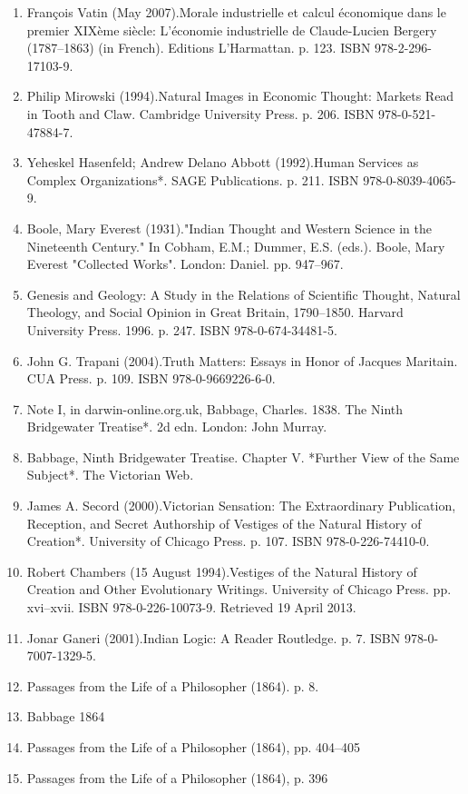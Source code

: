 \begin{enumerate}
\item François Vatin (May 2007).Morale industrielle et calcul économique dans le premier XIXème siècle: L'économie industrielle de Claude-Lucien Bergery (1787–1863) (in French). Editions L'Harmattan. p. 123. ISBN 978-2-296-17103-9.
\item Philip Mirowski (1994).Natural Images in Economic Thought: Markets Read in Tooth and Claw. Cambridge University Press. p. 206. ISBN 978-0-521-47884-7.
\item Yeheskel Hasenfeld; Andrew Delano Abbott (1992).Human Services as Complex Organizations*. SAGE Publications. p. 211. ISBN 978-0-8039-4065-9.
\item Boole, Mary Everest (1931)."Indian Thought and Western Science in the Nineteenth Century." In Cobham, E.M.; Dummer, E.S. (eds.). Boole, Mary Everest "Collected Works". London: Daniel. pp. 947–967.
\item Genesis and Geology: A Study in the Relations of Scientific Thought, Natural Theology, and Social Opinion in Great Britain, 1790–1850. Harvard University Press. 1996. p. 247. ISBN 978-0-674-34481-5.
\item John G. Trapani (2004).Truth Matters: Essays in Honor of Jacques Maritain. CUA Press. p. 109. ISBN 978-0-9669226-6-0.
\item Note I, in darwin-online.org.uk, Babbage, Charles. 1838. The Ninth Bridgewater Treatise*. 2d edn. London: John Murray.
\item Babbage, Ninth Bridgewater Treatise. Chapter V. *Further View of the Same Subject*. The Victorian Web.
\item James A. Secord (2000).Victorian Sensation: The Extraordinary Publication, Reception, and Secret Authorship of Vestiges of the Natural History of Creation*. University of Chicago Press. p. 107. ISBN 978-0-226-74410-0.
\item Robert Chambers (15 August 1994).Vestiges of the Natural History of Creation and Other Evolutionary Writings. University of Chicago Press. pp. xvi–xvii. ISBN 978-0-226-10073-9. Retrieved 19 April 2013.
\item Jonar Ganeri (2001).Indian Logic: A Reader Routledge. p. 7. ISBN 978-0-7007-1329-5.
\item Passages from the Life of a Philosopher (1864). p. 8.
\item Babbage 1864 
\item Passages from the Life of a Philosopher (1864), pp. 404–405  
\item Passages from the Life of a Philosopher (1864), p. 396  

\end{enumerate}
